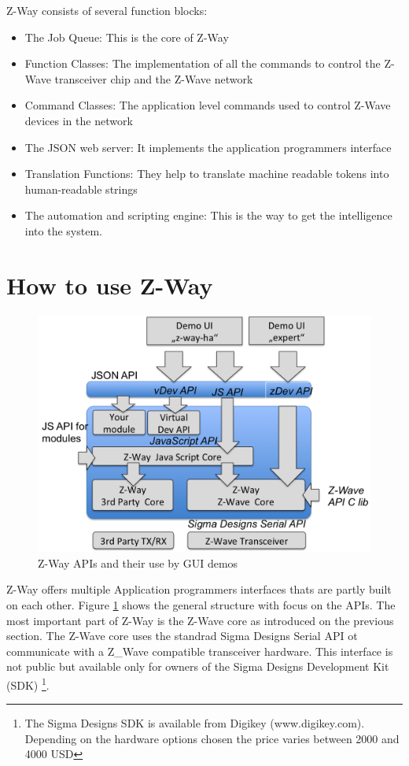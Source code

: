 Z-Way consists of several function blocks:

\begin{itemize}
\item The Job Queue: This is the core of Z-Way
\item Function Classes: The implementation of all the commands to control the Z-Wave transceiver chip and the Z-Wave network
\item Command Classes: The application level commands used to control Z-Wave devices in the network
\item The JSON web server: It implements the application programmers interface
\item Translation Functions: They help to translate machine readable tokens into human-readable strings
\item The automation and scripting engine: This is the way to get the intelligence into the system.
\end{itemize}

\section{How to use Z-Way}


\begin{figure} 
\begin{center}
\includegraphics[scale=0.6]{pics/apis.png}
\caption{Z-Way APIs and their use by GUI demos}
\label{apis} 
\end{center} 
\end{figure}

Z-Way offers multiple Application programmers interfaces thats are partly built on each other.
Figure \ref{apis} shows the general structure with focus on the APIs. The most important part of
Z-Way is the Z-Wave core as introduced on the previous section. The Z-Wave core uses the standrad
Sigma Designs Serial API ot communicate with a Z_Wave compatible transceiver hardware. This
interface is not public but available only for owners of the Sigma Designs Development Kit (SDK) 
\footnote{The Sigma Designs SDK is available from Digikey (www.digikey.com). Depending on the 
hardware options chosen the price varies between 2000 and 4000 USD}.

